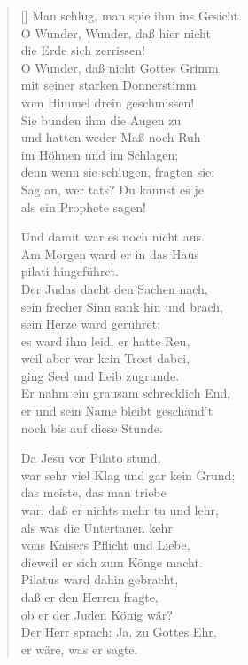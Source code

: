 \begin{multicols}{2}
\begin{verse}[\versewidth]
 Man schlug, man spie ihm ins Gesicht.\\
O Wunder, Wunder, daß hier nicht\\
die Erde sich zerrissen!\\
O Wunder, daß nicht Gottes Grimm\\
mit seiner starken Donnerstimm\\
vom Himmel drein geschmissen!\\
Sie bunden ihm die Augen zu\\
und hatten weder Maß noch Ruh\\
im Höhnen und im Schlagen;\\
denn wenn sie schlugen, fragten sie:\\
Sag an, wer tats? Du kannst es je\\
als ein Prophete sagen!

 Und damit war es noch nicht aus.\\
Am Morgen ward er in das Haus\\
pilati hingeführet.\\
Der Judas dacht den Sachen nach,\\
sein frecher Sinn sank hin und brach,\\
sein Herze ward gerühret;\\
es ward ihm leid, er hatte Reu,\\
weil aber war kein Trost dabei,\\
ging Seel und Leib zugrunde.\\
Er nahm ein grausam schrecklich End,\\
er und sein Name bleibt geschänd't\\
noch bis auf diese Stunde.

 Da Jesu vor Pilato stund,\\
war sehr viel Klag und gar kein Grund;\\
das meiste, das man triebe\\
war, daß er nichts mehr tu und lehr,\\
als was die Untertanen kehr\\
vons Kaisers Pflicht und Liebe,\\
dieweil er sich zum Könge macht.\\
Pilatus ward dahin gebracht,\\
daß er den Herren fragte,\\
ob er der Juden König wär?\\
Der Herr sprach: Ja, zu Gottes Ehr,\\
er wäre, was er sagte.


\end{verse}
\end{multicols}
